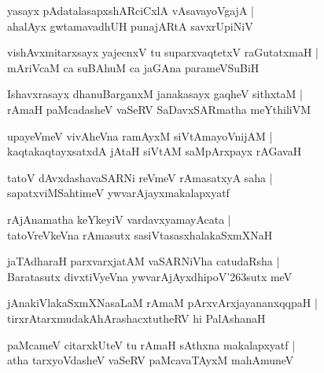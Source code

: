 \documentclass[twoside,12pt,openright]{book}
\def\S{\char'263}
\newcounter{shloka}[chapter]
\begin{document}
\begin{shloka}%
yasayx pAdatalasapxshARciCxlA vAsavayoVgajA |\\
ahalAyx gwtamavadhUH punajARtA savxrUpiNiV 
\end{shloka}

\begin{shloka}%
vishAvxmitarxsayx yajecnxV tu suparxvaqtetxV raGutatxmaH |\\
mAriVcaM ca suBAhuM ca jaGAna parameVSuBiH
\end{shloka}
 
\begin{shloka}%
Ishavxrasayx dhanuBarganxM janakasayx gaqheV sithxtaM |\\
rAmaH paMcadasheV vaSeRV SaDavxSARmatha meYthiliVM
\end{shloka}

\begin{shloka}%
upayeVmeV vivAheVna ramAyxM siVtAmayoVnijAM |\\
kaqtakaqtayxsatxdA jAtaH siVtAM saMpArxpayx rAGavaH 
\end{shloka}

\begin{shloka}%
tatoV dAvxdashavaSARNi reVmeV rAmasatxyA saha |\\
sapatxviMSahtimeV ywvarAjayxmakalapxyatf 
\end{shloka}

\begin{shloka}%
rAjAnamatha keYkeyiV vardavxyamayAcata |\\
tatoVreVkeVna rAmasutx sasiVtasasxhalakaSxmXNaH 
\end{shloka}

\begin{shloka}%
jaTAdharaH parxvarxjatAM vaSARNiVha catudaRsha |\\
Baratasutx divxtiVyeVna ywvarAjAyxdhipoV\S sutx meV 
\end{shloka}

\begin{shloka}%
jAnakiVlakaSxmXNasaLaM rAmaM pArxvArxjayananxqqpaH |\\
tirxrAtarxmudakAhArashacxtutheRV hi PalAshanaH
\end{shloka}

\begin{shloka}%
paMcameV citarxkUteV tu rAmaH sAthxna makalapxyatf |\\
atha tarxyoVdasheV vaSeRV paMcavaTAyxM mahAmuneV 
\end{shloka}
\end{document}
